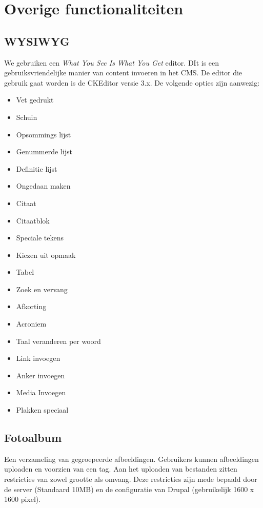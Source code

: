 
\section{Overige functionaliteiten}
\label{sec:overigefunctionaliteiten}

\subsection{WYSIWYG}
We gebruiken een \emph{What You See Is What You Get} editor. DIt is een gebruiksvriendelijke manier van content invoeren in het CMS. De editor die gebruik gaat worden is de CKEditor versie 3.x. De volgende opties zijn aanwezig:

\begin{itemize}
  \item Vet gedrukt
  \item Schuin
  \item Opsommings lijst
  \item Genummerde lijst 
  \item Definitie lijst
  \item Ongedaan maken
   \item Citaat
  \item Citaatblok
  \item Speciale tekens
  \item Kiezen uit opmaak
  \item Tabel
  \item Zoek en vervang
  \item Afkorting
  \item Acroniem
  \item Taal veranderen per woord
  \item Link invoegen
  \item Anker invoegen
  \item Media Invoegen
  \item Plakken speciaal
\end{itemize}

\subsection{Fotoalbum}
Een verzameling van gegroepeerde afbeeldingen. Gebruikers kunnen afbeeldingen uploaden en voorzien van een tag. Aan het uploaden van bestanden zitten restricties van zowel grootte als omvang. Deze restricties zijn mede bepaald door de server (Standaard 10MB) en de configuratie van Drupal (gebruikelijk 1600 x 1600 pixel).

